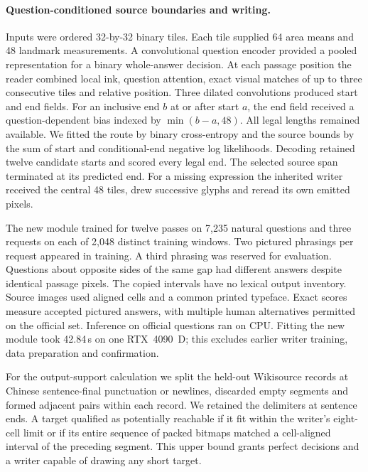 \documentclass[12pt,a4paper]{article}
\providecommand{\DIFadd}[1]{{\protect\color{blue} \sf #1}} %
\begin{document}
\paragraph{\DIFadd{Question-conditioned source boundaries and writing.}}
\DIFadd{Inputs were ordered 32-by-32 binary tiles. Each tile supplied 64 area means and 48 landmark measurements. A convolutional question encoder provided a pooled representation for a binary whole-answer decision. At each passage position the reader combined local ink, question attention, exact visual matches of up to three consecutive tiles and relative position. Three dilated convolutions produced start and end fields. For an inclusive end $b$ at or after start $a$, the end field received a question-dependent bias indexed by $\min(b-a,48)$. All legal lengths remained available. We fitted the route by binary cross-entropy and the source bounds by the sum of start and conditional-end negative log likelihoods. Decoding retained twelve candidate starts and scored every legal end. The selected source span terminated at its predicted end. For a missing expression the inherited writer received the central 48 tiles, drew successive glyphs and reread its own emitted pixels.
}

\DIFadd{The new module trained for twelve passes on 7,235 natural questions and three requests on each of 2,048 distinct training windows. Two pictured phrasings per request appeared in training. A third phrasing was reserved for evaluation. Questions about opposite sides of the same gap had different answers despite identical passage pixels. The copied intervals have no lexical output inventory. Source images used aligned cells and a common printed typeface. Exact scores measure accepted pictured answers, with multiple human alternatives permitted on the official set. Inference on official questions ran on CPU. Fitting the new module took 42.84\,s on one RTX~4090~D; this excludes earlier writer training, data preparation and confirmation.
}

\DIFadd{For the output-support calculation we split the held-out Wikisource records at Chinese sentence-final punctuation or newlines, discarded empty segments and formed adjacent pairs within each record. We retained the delimiters at sentence ends. A target qualified as potentially reachable if it fit within the writer's eight-cell limit or if its entire sequence of packed bitmaps matched a cell-aligned interval of the preceding segment. This upper bound grants perfect decisions and a writer capable of drawing any short target.
}
\end{document}
